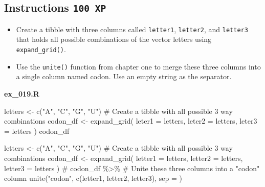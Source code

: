 \documentclass[
  letterpaper,
  DIV=11,
  numbers=noendperiod]{scrreprt}
\newenvironment{Shaded}{\begin{snugshade}}{\end{snugshade}}
\newcommand{\AttributeTok}[1]{\textcolor[rgb]{0.40,0.45,0.13}{#1}}
\newcommand{\CommentTok}[1]{\textcolor[rgb]{0.37,0.37,0.37}{#1}}
\newcommand{\FunctionTok}[1]{\textcolor[rgb]{0.28,0.35,0.67}{#1}}
\newcommand{\NormalTok}[1]{\textcolor[rgb]{0.00,0.23,0.31}{#1}}
\newcommand{\OtherTok}[1]{\textcolor[rgb]{0.00,0.23,0.31}{#1}}
\newcommand{\SpecialCharTok}[1]{\textcolor[rgb]{0.37,0.37,0.37}{#1}}
\newcommand{\StringTok}[1]{\textcolor[rgb]{0.13,0.47,0.30}{#1}}
\providecommand{\tightlist}{%
  \setlength{\itemsep}{0pt}\setlength{\parskip}{0pt}}\usepackage{longtable,booktabs,array}
\begin{document}
\hypertarget{instructions-100-xp-16}{%
\subsection*{\texorpdfstring{Instructions
\texttt{100\ XP}}{Instructions 100 XP}}\label{instructions-100-xp-16}}

\begin{itemize}
\tightlist
\item
  Create a tibble with three columns called \texttt{letter1},
  \texttt{letter2}, and \texttt{letter3} that holds all possible
  combinations of the vector letters using \texttt{expand\_grid()}.
\item
  Use the \texttt{unite()} function from chapter one to merge these
  three columns into a single column named codon. Use an empty string as
  the separator.
\end{itemize}

\textbf{ex\_019.R}

\begin{Shaded}
\begin{Highlighting}[]
\NormalTok{letters }\OtherTok{\textless{}{-}} \FunctionTok{c}\NormalTok{(}\StringTok{"A"}\NormalTok{, }\StringTok{"C"}\NormalTok{, }\StringTok{"G"}\NormalTok{, }\StringTok{"U"}\NormalTok{)}
\CommentTok{\# Create a tibble with all possible 3 way combinations}
\NormalTok{codon\_df }\OtherTok{\textless{}{-}} \FunctionTok{expand\_grid}\NormalTok{(}
    \AttributeTok{leter1 =}\NormalTok{ letters,}
    \AttributeTok{leter2 =}\NormalTok{ letters,}
    \AttributeTok{leter3 =}\NormalTok{ letters}
\NormalTok{)}
\NormalTok{codon\_df}

\NormalTok{letters }\OtherTok{\textless{}{-}} \FunctionTok{c}\NormalTok{(}\StringTok{"A"}\NormalTok{, }\StringTok{"C"}\NormalTok{, }\StringTok{"G"}\NormalTok{, }\StringTok{"U"}\NormalTok{)}
\CommentTok{\# Create a tibble with all possible 3 way combinations}
\NormalTok{codon\_df }\OtherTok{\textless{}{-}} \FunctionTok{expand\_grid}\NormalTok{(}
  \AttributeTok{letter1 =}\NormalTok{ letters,}
  \AttributeTok{letter2 =}\NormalTok{ letters,}
  \AttributeTok{letter3 =}\NormalTok{ letters}
\NormalTok{)}
\CommentTok{\#}
\NormalTok{codon\_df }\SpecialCharTok{\%\textgreater{}\%} 
  \CommentTok{\# Unite these three columns into a "codon" column}
  \FunctionTok{unite}\NormalTok{(}\StringTok{"codon"}\NormalTok{,  }\FunctionTok{c}\NormalTok{(letter1, letter2, letter3),}
    \AttributeTok{sep =} \StringTok{\textquotesingle{}\textquotesingle{}}
\NormalTok{  )}
\end{Highlighting}
\end{Shaded}
\end{document}
